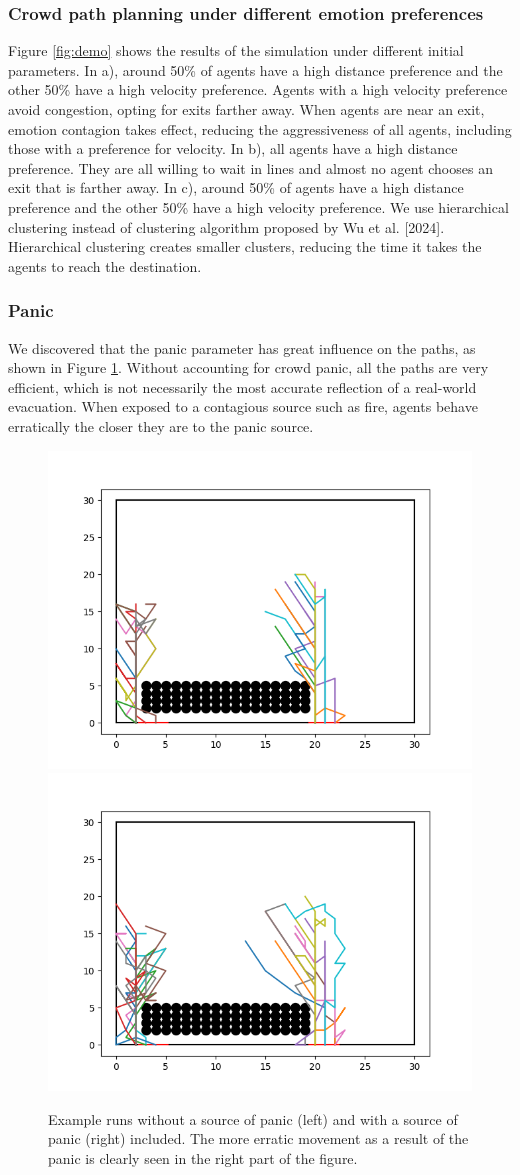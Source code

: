 \documentclass[9pt]{pnas-new}
\begin{document}
\subsubsection{Crowd path planning under different emotion preferences}
Figure \ref{fig:demo} shows the results of the simulation under different initial parameters. 
In a), around 50\% of agents have a high distance preference and the other 50\% have a high velocity preference. Agents with a high velocity preference avoid congestion, opting for exits farther away. When agents are near an exit, emotion contagion takes effect, reducing the aggressiveness of all agents, including those with a preference for velocity.  
In b), all agents have a high distance preference. They are all willing to wait in lines and almost no agent chooses an exit that is farther away. 
In c), around 50\% of agents have a high distance preference and the other 50\% have a high velocity preference. We use hierarchical clustering instead of clustering algorithm proposed by Wu et al. [2024]. Hierarchical clustering creates smaller clusters, reducing the time it takes the agents to reach the destination. 

\subsubsection{Panic}
We discovered that the panic parameter has great influence on the paths, as shown in Figure \ref{fig:panic}. Without accounting for crowd panic, all the paths are very efficient, which is not necessarily the most accurate reflection of a real-world evacuation. When exposed to a contagious source such as fire, agents behave erratically the closer they are to the panic source.

\begin{figure}[h!]
    \centering
    \includegraphics[width=0.45\linewidth]{fig/path_plot_nopanic.png}
    \hfill
    \includegraphics[width=0.45\linewidth]{fig/path_plot_panic.png}
    \caption{Example runs without a source of panic (left) and with a source of panic (right) included. The more erratic movement as a result of the panic is clearly seen in the right part of the figure.}
    \label{fig:panic}
\end{figure}
\end{document}

